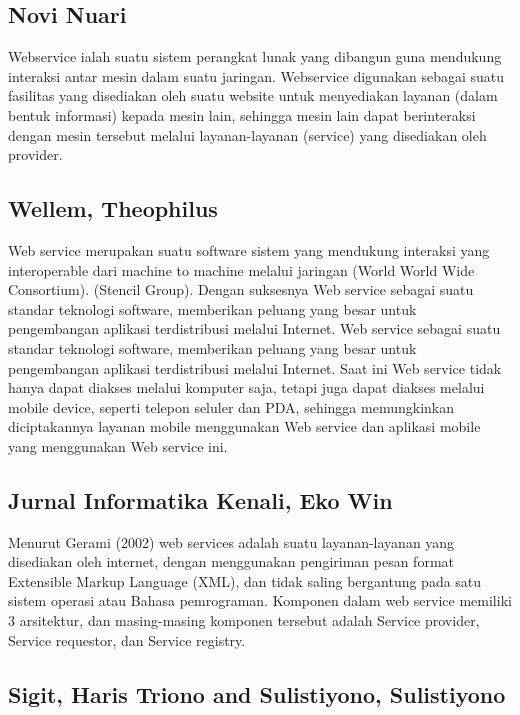 \subsection{Novi Nuari}

	Webservice ialah suatu sistem perangkat lunak yang dibangun guna mendukung interaksi antar mesin dalam suatu jaringan. Webservice digunakan sebagai suatu fasilitas yang disediakan oleh suatu website untuk menyediakan layanan (dalam bentuk informasi) kepada mesin lain, sehingga mesin lain dapat berinteraksi dengan mesin tersebut melalui layanan-layanan (service) yang disediakan oleh provider\cite{nuari2014perancangan}.

\subsection{Wellem, Theophilus}

	Web service merupakan suatu software sistem yang mendukung interaksi yang interoperable dari machine to machine melalui jaringan (World World Wide Consortium).  (Stencil Group). Dengan suksesnya Web service sebagai suatu standar teknologi software, memberikan peluang yang besar untuk pengembangan aplikasi terdistribusi melalui Internet.
Web service sebagai suatu standar teknologi software, memberikan peluang yang besar untuk pengembangan aplikasi terdistribusi melalui Internet. Saat ini Web service tidak hanya dapat diakses melalui komputer saja, tetapi juga dapat diakses melalui mobile device, seperti telepon seluler dan PDA, sehingga memungkinkan diciptakannya layanan mobile menggunakan Web service dan aplikasi mobile yang menggunakan Web service ini\cite{wellem2015perancangan}.

\subsection{Jurnal Informatika Kenali, Eko Win }

	Menurut Gerami (2002) web services adalah suatu layanan-layanan yang disediakan oleh internet, dengan menggunakan pengiriman pesan format Extensible Markup Language (XML), dan tidak saling bergantung pada satu sistem operasi atau Bahasa pemrograman. Komponen dalam web service memiliki 3 arsitektur, dan masing-masing komponen tersebut adalah Service provider, Service requestor, dan Service registry\cite{kenali2015desain}. 

\subsection{Sigit, Haris Triono and Sulistiyono, Sulistiyono}

